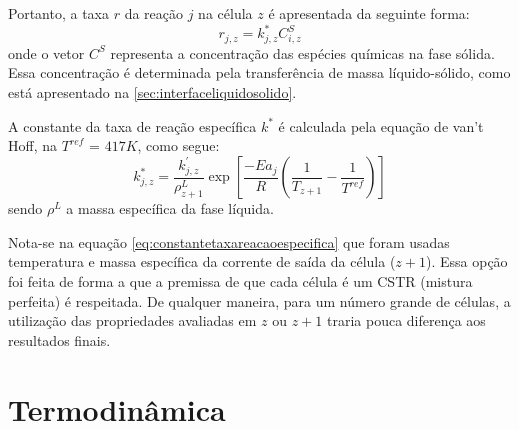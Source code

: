 Portanto, a taxa $r$ da reação $j$ na célula $z$ é apresentada da seguinte
forma:
\begin{equation}
r_{j,z} = k^{*}_{j,z}C^{S}_{i,z}
\label{eq:taxareacao}
\end{equation}
onde o vetor $C^{S}$ representa a concentração das espécies químicas na fase
sólida. Essa concentração é determinada pela transferência de massa
líquido-sólido, como está apresentado na \autoref{sec:interfaceliquidosolido}.

A constante da taxa de reação específica $k^{*}$ é calculada pela
equação de van't Hoff, na $T^{ref}$ = $417 K$, como segue:
\begin{equation}
k^{*}_{j,z} = \dfrac{k^{'}_{j,z}} {\rho^{L}_{z+1}} \exp
\left[{\dfrac{-Ea_j}{R} \left (\dfrac{1}{T_{z+1}} -
\dfrac{1}{T^{ref}} \right )}\right]
\label{eq:constantetaxareacaoespecifica}
\end{equation}
sendo $\rho^L$ a massa específica da fase líquida.

Nota-se na equação \autoref{eq:constantetaxareacaoespecifica} que foram usadas
temperatura e massa específica da corrente de saída da célula ($z+1$).
Essa opção foi feita de forma a que a premissa de que cada célula
é um CSTR (mistura perfeita) é respeitada.
De qualquer maneira, para um número grande de células, a utilização das propriedades
avaliadas em $z$ ou $z+1$ traria pouca diferença aos resultados finais.


\section{Termodinâmica} \label{sec:termodinamica}

